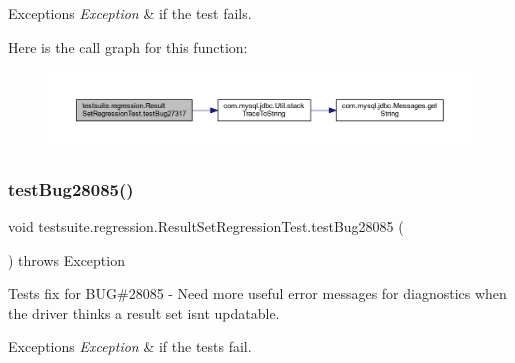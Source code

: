 \begin{DoxyExceptions}{Exceptions}
{\em Exception} & if the test fails. \\
\hline
\end{DoxyExceptions}
Here is the call graph for this function\+:
\nopagebreak
\begin{figure}[H]
\begin{center}
\leavevmode
\includegraphics[width=350pt]{classtestsuite_1_1regression_1_1_result_set_regression_test_af045c2d205dada239fec239d477c2563_cgraph}
\end{center}
\end{figure}
\mbox{\label{classtestsuite_1_1regression_1_1_result_set_regression_test_a85ca3f94b415a4fd27c69354a16eb5e5}} 
\subsubsection{\texorpdfstring{test\+Bug28085()}{testBug28085()}}
{\footnotesize\ttfamily void testsuite.\+regression.\+Result\+Set\+Regression\+Test.\+test\+Bug28085 (\begin{DoxyParamCaption}{ }\end{DoxyParamCaption}) throws Exception}

Tests fix for B\+UG\#28085 -\/ Need more useful error messages for diagnostics when the driver thinks a result set isn\textquotesingle{}t updatable.


\begin{DoxyExceptions}{Exceptions}
{\em Exception} & if the tests fail. \\
\hline
\end{DoxyExceptions}
\mbox{\label{classtestsuite_1_1regression_1_1_result_set_regression_test_a4a7f176d9e3539b3acd902e97e904e17}} 
